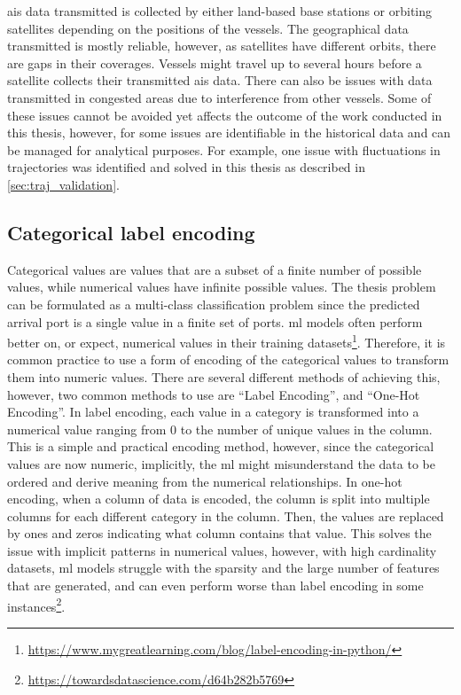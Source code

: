 \acrshort{ais} data transmitted is collected by either land-based base stations or orbiting satellites depending on the positions of the vessels. The geographical data transmitted is mostly reliable, however, as satellites have different orbits, there are gaps in their coverages. Vessels might travel up to several hours before a satellite collects their transmitted \acrshort{ais} data. There can also be issues with data transmitted in congested areas due to interference from other vessels. Some of these issues cannot be avoided yet affects the outcome of the work conducted in this thesis, however, for some issues are identifiable in the historical data and can be managed for analytical purposes. For example, one issue with fluctuations in trajectories was identified and solved in this thesis as described in \cref{sec:traj_validation}.

\subsection{Categorical label encoding}
\label{sec:label_encoding}

Categorical values are values that are a subset of a finite number of possible values, while numerical values have infinite possible values. The thesis problem can be formulated as a multi-class classification problem since the predicted arrival port is a single value in a finite set of ports. \acrshort{ml} models often perform better on, or expect, numerical values in their training datasets\footnote{\url{https://www.mygreatlearning.com/blog/label-encoding-in-python/}}. Therefore, it is common practice to use a form of encoding of the categorical values to transform them into numeric values. There are several different methods of achieving this, however, two common methods to use are ``Label Encoding'', and ``One-Hot Encoding''. In label encoding, each value in a category is transformed into a numerical value ranging from 0 to the number of unique values in the column. This is a simple and practical encoding method, however, since the categorical values are now numeric, implicitly, the \acrshort{ml} might misunderstand the data to be ordered and derive meaning from the numerical relationships. In one-hot encoding, when a column of data is encoded, the column is split into multiple columns for each different category in the column. Then, the values are replaced by ones and zeros indicating what column contains that value. This solves the issue with implicit patterns in numerical values, however, with high cardinality datasets, \acrshort{ml} models struggle with the sparsity and the large number of features that are generated, and can even perform worse than label encoding in some instances\footnote{\url{https://towardsdatascience.com/d64b282b5769}}.


